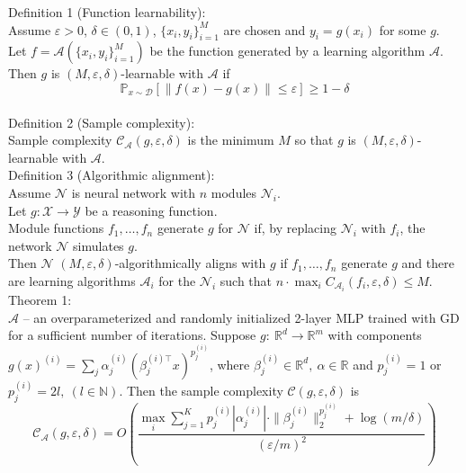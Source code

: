 \documentclass{article}
\begin{document}
	Definition 1 (Function learnability):\\
		Assume $\varepsilon >0 $, $\delta\in (0,1)$, $\{x_i, y_i\}_{i=1}^M$ are chosen and $y_i = g(x_i)$ for some $g$. \\
		Let $f = \mathcal{A}(\{x_i, y_i\}_{i=1}^M)$ be the function generated by a learning algorithm $\mathcal{A}$.
		Then $g$ is $(M, \varepsilon, \delta)$-learnable with $\mathcal{A}$ if 
		$$\mathbb{P}_{x\sim \mathcal{D}}\left[\|f(x)-g(x)\|\leq \varepsilon\right] \geq 1-\delta$$ \\

	Definition 2 (Sample complexity):\\
		Sample complexity $\mathcal{C}_\mathcal{A}(g, \varepsilon, \delta)$ is the minimum $M$ so that $g$
		is $(M, \varepsilon, \delta)$-learnable with $\mathcal{A}$.\\

    Definition 3 (Algorithmic alignment):\\
        Assume $\mathcal{N}$ is neural network with $n$ modules $\mathcal{N}_i$. \\
        Let $g: \mathcal{X} \to \mathcal{Y}$ be a reasoning function. \\
        Module functions $f_1, \dots, f_n$ generate $g$ for $\mathcal{N}$ if, by replacing $\mathcal{N}_i$ with $f_i$, the network $\mathcal{N}$ simulates $g$.\\ 
        Then $\mathcal{N}$ $(M, \varepsilon, \delta)$-algorithmically aligns with $g$ if $f_1, \dots, f_n$ generate $g$ and 
        there are learning algorithms $\mathcal{A}_i$ for the $\mathcal{N}_i$ such that $n\cdot\max_i C_{\mathcal{A}_i}(f_i, \varepsilon, \delta)\leq M$.\\	

    
    Theorem 1:\\ 
        $\mathcal{A}$ -- an overparameterized and randomly initialized 2-layer MLP trained with GD for a sufficient number of iterations.
        Suppose $g:~\mathbb{R}^d\to \mathbb{R}^m$ with components $g(x)^{(i)} = \sum_j \alpha_j^{(i)} \left(\beta_j^{(i)\top}x\right)^{p_j^{(i)}}$, where
        $\beta_j^{(i)}\in \mathbb{R}^d,~\alpha\in\mathbb{R}$ and $p_j^{(i)} = 1$ or $p_j^{(i)} = 2l,~(l\in \mathbb{N})$. 
        Then the sample complexity $\mathcal{C}(g, \varepsilon, \delta)$ is 
        \[\mathcal{C}_\mathcal{A}(g, \varepsilon, \delta) = O\left( \frac{\max_i\sum_{j=1}^{K} p_j^{(i)}|\alpha_j^{(i)}|\cdot\|\beta_j^{(i)}\|_2^{p_j^{(i)}} + \log (m / \delta)}{(\varepsilon / m)^2} \right)\]
\end{document}
